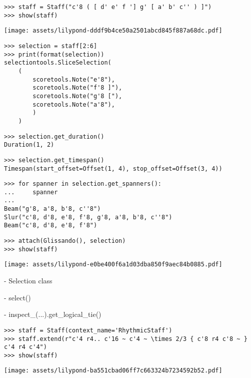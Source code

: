 \begin{abjadbookoutput}
\begin{singlespacing}
\vspace{-0.5\baselineskip}
\begin{lstlisting}
>>> staff = Staff("c'8 ( [ d' e' f '] g' [ a' b' c'' ) ]")
>>> show(staff)
\end{lstlisting}
\noindent\texttt{[image: assets/lilypond-dddf9b4ce50a2501abcd845f887a68dc.pdf]}
\begin{lstlisting}
>>> selection = staff[2:6]
>>> print(format(selection))
selectiontools.SliceSelection(
    (
        scoretools.Note("e'8"),
        scoretools.Note("f'8 ]"),
        scoretools.Note("g'8 ["),
        scoretools.Note("a'8"),
        )
    )
\end{lstlisting}
\begin{lstlisting}
>>> selection.get_duration()
Duration(1, 2)
\end{lstlisting}
\begin{lstlisting}
>>> selection.get_timespan()
Timespan(start_offset=Offset(1, 4), stop_offset=Offset(3, 4))
\end{lstlisting}
\begin{lstlisting}
>>> for spanner in selection.get_spanners():
...     spanner
...
Beam("g'8, a'8, b'8, c''8")
Slur("c'8, d'8, e'8, f'8, g'8, a'8, b'8, c''8")
Beam("c'8, d'8, e'8, f'8")
\end{lstlisting}
\begin{lstlisting}
>>> attach(Glissando(), selection)
>>> show(staff)
\end{lstlisting}
\noindent\texttt{[image: assets/lilypond-e0be400f6a1d03dba850f9aec84b0885.pdf]}
\end{singlespacing}
\end{abjadbookoutput}

-   Selection class

-   select()

-   inspect\_(...).get\_logical\_tie()

\begin{comment}
<abjad>
staff = Staff(context_name='RhythmicStaff')
staff.extend(r"c'4 r4.. c'16 ~ c'4 ~ \times 2/3 { c'8 r4 c'8 ~ } c'4 r4 c'4")
show(staff)
</abjad>
\end{comment}

\begin{abjadbookoutput}
\begin{singlespacing}
\vspace{-0.5\baselineskip}
\begin{lstlisting}
>>> staff = Staff(context_name='RhythmicStaff')
>>> staff.extend(r"c'4 r4.. c'16 ~ c'4 ~ \times 2/3 { c'8 r4 c'8 ~ } c'4 r4 c'4")
>>> show(staff)
\end{lstlisting}
\noindent\texttt{[image: assets/lilypond-ba551cbad06ff7c663324b7234592b52.pdf]}
\end{singlespacing}
\end{abjadbookoutput}

